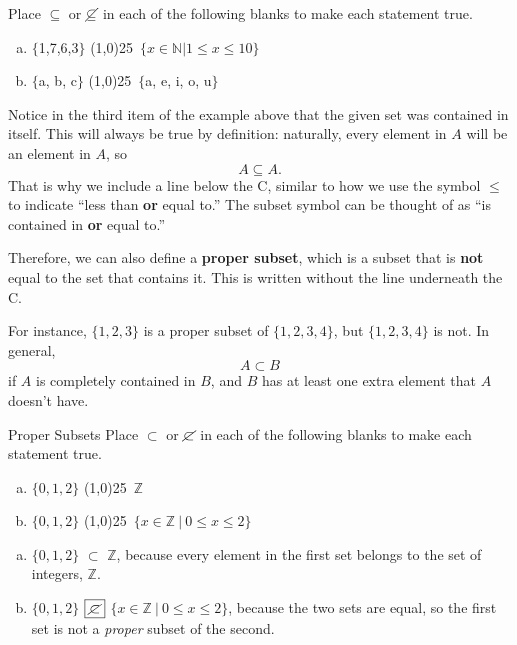 \begin{try}
Place $\subseteq$ or $\cancel{\subseteq}$ in each of the following blanks to make each statement true.\\

\begin{enumerate}[(a)]
\item $\{$1,7,6,3$\}$ \line(1,0){25}\ $\{x \in \mathbb{N} | 1 \leq x \leq 10\}$\\

\item $\{$a, b, c$\}$ \line(1,0){25}\ $\{$a, e, i, o, u$\}$
\end{enumerate}
\end{try}

Notice in the third item of the example above that the given set was contained in itself.  This will always be true by definition: naturally, every element in $A$ will be an element in $A$, so \[A \subseteq A.\]  That is why we include a line below the C, similar to how we use the symbol $\leq$ to indicate ``less than \textbf{or} equal to.''  The subset symbol can be thought of as ``is contained in \textbf{or} equal to.''

Therefore, we can also define a \textbf{proper subset}, which is a subset that is \textbf{not} equal to the set that contains it.  This is written without the line underneath the C.

For instance, $\{1,2,3\}$ is a proper subset of $\{1,2,3,4\}$, but $\{1,2,3,4\}$ is not.  In general,
\[A \subset B\] if $A$ is completely contained in $B$, and $B$ has at least one extra element that $A$ doesn't have.
\pagebreak

\begin{example}{Proper Subsets}
Place $\subset$ or $\cancel{\subset}$ in each of the following blanks to make each statement true.\\

\begin{enumerate}[(a)]
\item $\{0,1,2\}$ \line(1,0){25}\ $\mathbb{Z}$\\

\item $\{0,1,2\}$ \line(1,0){25}\ $\{x \in \mathbb{Z} \ | \ 0 \leq x \leq 2\}$
\end{enumerate}

\sol
\begin{enumerate}[(a)]
\item $\{0,1,2\}$ $\boxed{\subset}$ $\mathbb{Z}$, because every element in the first set belongs to the set of integers, $\mathbb{Z}$.\\

\item $\{0,1,2\}$ $\boxed{\cancel{\subset}}$ $\{x \in \mathbb{Z} \ | \ 0 \leq x \leq 2\}$, because the two sets are equal, so the first set is not a \emph{proper} subset of the second.
\end{enumerate}
\end{example}

